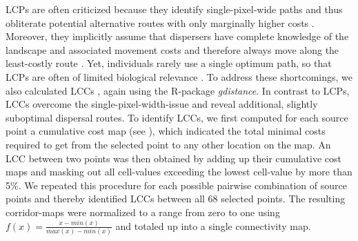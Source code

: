 \documentclass[abstract=on,10pt,a4paper,bibliography=totocnumbered]{scrartcl}
\begin{document}
LCPs are often criticized because they identify single-pixel-wide paths and thus
obliterate potential alternative routes with only marginally higher costs
\citep{Pinto.2009}. Moreover, they implicitly assume that dispersers have
complete knowledge of the landscape and associated movement costs and therefore
always move along the least-costly route \citep{Carroll.2012}. Yet, individuals
rarely use a single optimum path, so that LCPs are often of limited biological
relevance \citep{Pinto.2009, Pullinger.2010}. To address these shortcomings, we
also calculated LCCs \citep{Pinto.2009, Sawyer.2011}, again using the R-package
\textit{gdistance}. In contrast to LCPs, LCCs overcome the
single-pixel-width-issue and reveal additional, slightly suboptimal dispersal
routes. To identify LCCs, we first computed for each source point a cumulative
cost map (see ), which indicated the total minimal costs
required to get from the selected point to any other location on the map. An LCC
between two points was then obtained by adding up their cumulative cost maps and
masking out all cell-values exceeding the lowest cell-value by more than 5\%. We
repeated this procedure for each possible pairwise combination of source points
and thereby identified LCCs between all 68 selected points. The resulting
corridor-maps were normalized to a range from zero to one using \(f(x) = \frac{x
- min(x)}{max(x) - min(x)}\) and totaled up into a single connectivity map.
\end{document}
